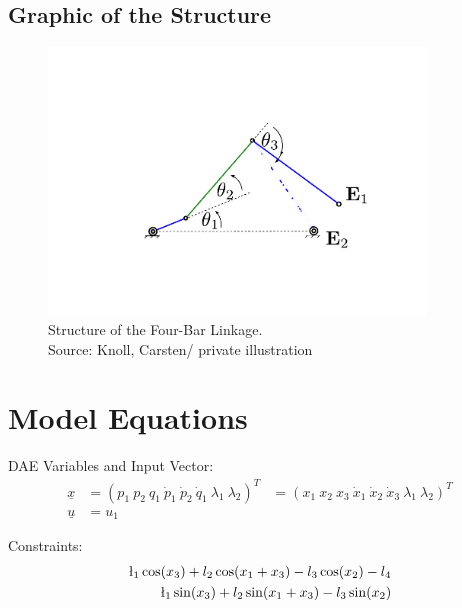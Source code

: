 \documentclass[10pt,a4paper]{article}
\begin{document}
	 \subsection{Graphic of the Structure}	
	\begin{figure}[H]
		\centering
		\captionsetup{justification=centering, margin=1cm}
		\includegraphics[width=100mm]{viergelenk.pdf}
		\caption{Structure of the Four-Bar Linkage. \\ \footnotesize{Source: Knoll, Carsten/ private illustration}}
	\end{figure}

	
	
	\section{Model Equations} %
	
	DAE Variables and Input Vector:
	\begin{align*}
		\underline{x} &= (p_1 \ p_2 \ q_1 \ \dot{p}_1 \ \dot{p}_2 \ \dot{q}_1 \ \lambda_1 \ \lambda_2)^T &= (x_1 \ x_2 \ x_3 \ \dot{x}_1 \ \dot{x}_2 \ \dot{x}_3 \ \lambda_1 \ \lambda_2)^T \\
		\underline{u} &= u_1
	\end{align*}
	
	\noindent Constraints:			
	\begin{subequations}
	\begin{align}
		\l_1\cos(x_3) + l_2\cos(x_1 + x_3) - l_3\cos(x_2) - l_4 \\
		\l_1\sin(x_3) + l_2\sin(x_1 + x_3) - l_3\sin(x_2)
	\end{align}
	\end{subequations}
	
\end{document}
